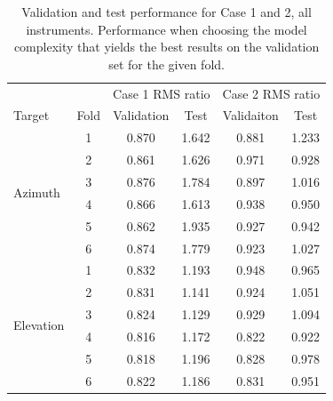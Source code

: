 \newpage 
\begin{table}[!htbp]
    \centering
    \caption{Validation and test performance for Case 1 and 2, all instruments.
    Performance when choosing the model complexity that yields the best results on the validation set for the given fold.}
    \begin{tabular}{lccccc}
        \toprule
        & & \multicolumn{2}{c}{Case 1 RMS ratio} & \multicolumn{2}{c}{Case 2 RMS ratio} \\
        \cmidrule{3-4} \cmidrule{5-6}
        Target & Fold & Validation & Test &  Validaiton &  Test \\
        \midrule
        \multirow{6}{*}{Azimuth} & 1 &  0.870 &       1.642 &      0.881 &       1.233 \\
                            & 2 &  0.861 &       1.626 &      0.971 &       0.928 \\
                            & 3 &  0.876 &       1.784 &      0.897 &       1.016 \\
                            & 4 &  0.866 &       1.613 &      0.938 &       0.950 \\
                            & 5 &  0.862 &       1.935 &      0.927 &       0.942 \\
                            & 6 &  0.874 &       1.779 &      0.923 &       1.027 \\
                            \hline
        \multirow{6}{*}{Elevation} & 1 &  0.832 &       1.193 &      0.948 &       0.965 \\
                            & 2 &  0.831 &       1.141 &      0.924 &       1.051 \\
                            & 3 &  0.824 &       1.129 &      0.929 &       1.094 \\
                            & 4 &  0.816 &       1.172 &      0.822 &       0.922 \\
                            & 5 &  0.818 &       1.196 &      0.828 &       0.978 \\
                            & 6 &  0.822 &       1.186 &      0.831 &       0.951 \\
                            \bottomrule
    \end{tabular}
    \label{tab:results_minval_val_test_days_04_all}
\end{table}



